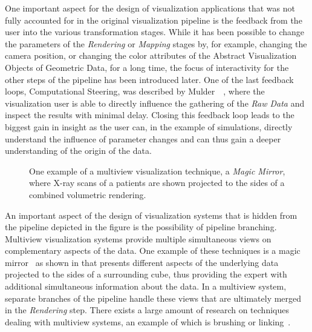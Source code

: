 One important aspect for the design of visualization applications that was not fully accounted for in the original visualization pipeline is the feedback from the user into the various transformation stages.  While it has been possible to change the parameters of the \emph{Rendering} or \emph{Mapping} stages by, for example, changing the camera position, or changing the color attributes of the Abstract Visualization Objects of Geometric Data, for a long time, the focus of interactivity for the other steps of the pipeline has been introduced later.  One of the last feedback loops, Computational Steering, was described by Mulder~\etal~\cite{mulder1999survey}, where the visualization user is able to directly influence the gathering of the \emph{Raw Data} and inspect the results with minimal delay.  Closing this feedback loop leads to the biggest gain in insight as the user can, in the example of simulations, directly understand the influence of parameter changes and can thus gain a deeper understanding of the origin of the data.

\begin{figure}
  \centering
  \caption{One example of a multiview visualization technique, a \emph{Magic Mirror}, where X-ray scans of a patients are shown projected to the sides of a combined volumetric rendering.}
  \label{fig:intro:mm}
\end{figure}

An important aspect of the design of visualization systems that is hidden from the pipeline depicted in the figure is the possibility of pipeline branching.  Multiview visualization systems provide multiple simultaneous views on complementary aspects of the data.  One example of these techniques is a magic mirror~\cite{konig1999multiple} as shown in  that presents different aspects of the underlying data projected to the sides of a surrounding cube, thus providing the expert with additional simultaneous information about the data.  In a multiview system, separate branches of the pipeline handle these views that are ultimately merged in the \emph{Rendering} step.  There exists a large amount of research on techniques dealing with multiview systems, an example of which is brushing or linking~\cite{tory2003mental}.



